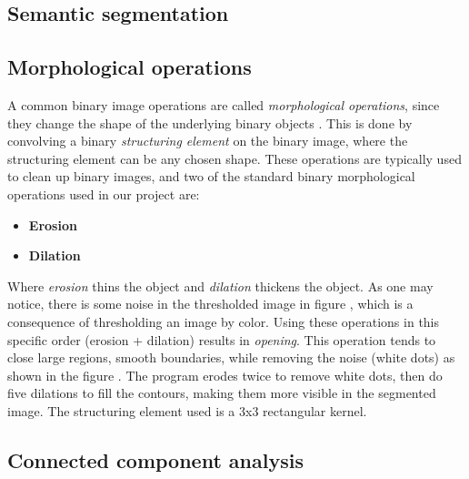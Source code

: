 \documentclass[USenglish]{ifimaster}  %
\begin{document}
\subsection{Semantic segmentation}
\subsection{Morphological operations}
A common binary image operations are called \textit{morphological operations}, since
they change the shape of the underlying binary objects \cite{Ritter}. This is done by convolving a binary \textit{structuring element} on the binary image, where the structuring element can be any chosen shape. These operations are typically used to clean up binary images, and two of the standard binary morphological operations used in our project are: 
\begin{itemize}
    \item \textbf{Erosion}
    \item \textbf{Dilation}
\end{itemize}

Where \textit{erosion} thins the object and \textit{dilation} thickens the object. As one may notice, there is some noise in the thresholded image in figure , which is a consequence of thresholding an image by color. Using these operations in this specific order (erosion + dilation) results in \textit{opening}. This operation tends to close large regions, smooth boundaries, while removing the noise (white dots) as shown in the figure . The program erodes twice to remove white dots, then do five dilations to fill the contours, making them more visible in the segmented image. The structuring element used is a 3x3 rectangular kernel.
\subsection{Connected component analysis}
\end{document}

